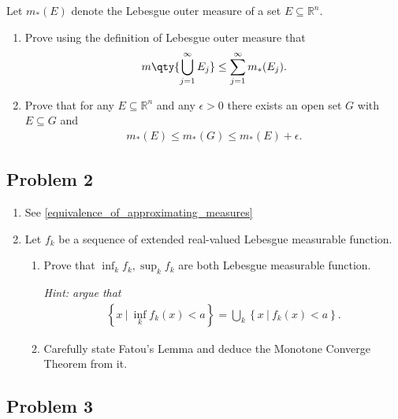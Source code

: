 Let \(m_*(E)\) denote the Lebesgue outer measure of a set
\(E \subseteq {\mathbb{R}}^n\).

\begin{enumerate}
\def\labelenumi{\alph{enumi}.}
\item
  Prove using the definition of Lebesgue outer measure that
  \begin{align*}
  m \qty{ \bigcup_{j=1}^{\infty } E_j  } \leq \sum_{j=1}^{\infty } m_*(E_j) 
  .\end{align*}
\item
  Prove that for any \(E \subseteq {\mathbb{R}}^n\) and any
  \(\epsilon> 0\) there exists an open set \(G\) with \(E \subseteq G\)
  and
  \begin{align*}
  m_*(E) \leq m_*(G) \leq m_*(E) + \epsilon
  .\end{align*}
\end{enumerate}

\hypertarget{problem-2-2}{%
\subsection{Problem 2}\label{problem-2-2}}

\begin{enumerate}
\def\labelenumi{\alph{enumi}.}
\item
  See \cref{equivalence_of_approximating_measures}
\item
  Let \(f_k\) be a sequence of extended real-valued Lebesgue measurable
  function.

  \begin{enumerate}
  \def\labelenumii{\roman{enumii}.}
  \item
    Prove that \(\inf_k f_k, \sup_k f_k\) are both Lebesgue measurable
    function.

    \emph{Hint: argue that}
    \begin{align*}
    \left\{{x {~\mathrel{\Big|}~}\inf_k f_k(x) < a}\right\} = \bigcup_k \left\{{x {~\mathrel{\Big|}~}f_k(x) < a}\right\}
    .\end{align*}
  \item
    Carefully state Fatou's Lemma and deduce the Monotone Converge
    Theorem from it.
  \end{enumerate}
\end{enumerate}

\hypertarget{problem-3-2}{%
\subsection{Problem 3}\label{problem-3-2}}

